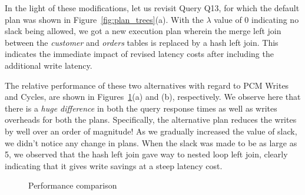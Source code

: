 In the light of these modifications, let
us revisit Query Q13, for which the default plan was shown in
Figure~\ref{fig:plan_trees}(a). With the $\lambda$ value of 0 indicating no slack being allowed, we got a new execution plan wherein the
merge left join between the \textit{customer} and \textit{orders}
tables is replaced by a hash left join. This indicates the immediate impact of revised latency costs after including the additional write latency.

The relative performance of
these two alternatives with regard to PCM Writes and Cycles, are shown
in Figures~\ref{fig:perf_comp}(a) and (b), respectively. We observe
here that there is a \emph{huge difference} in both the query response times as well as writes overheads for both the plans.
Specifically, the alternative plan reduces the writes by well over an
order of magnitude!
As we gradually increased the value of slack, we didn't notice any change in plans. When the slack was made to be as large as 5, we observed that the hash left join gave way to nested loop left join, clearly indicating that it gives write savings at a steep latency cost.


\begin{figure}[htbp]
\centering
	

\caption{Performance comparison}
\label{fig:perf_comp}
\end{figure}



